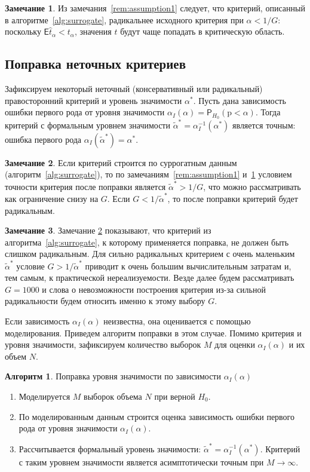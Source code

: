 \documentclass[specialist,
substylefile = spbu.rtx,
               subf,href,colorlinks=true,12pt]{disser}
\theoremstyle{definition}
\newtheorem{algorithm}{Алгоритм}
\newtheorem{remark}{Замечание}
\begin{document}
\begin{remark}\label{remark:liberal0}
	Из замечания~\ref{rem:assumption1} следует, что критерий, описанный в алгоритме~\ref{alg:surrogate}, радикальнее исходного критерия при $\alpha < 1/G$: поскольку $\mathsf E\hat t_\alpha < t_\alpha$, значения $t$ будут чаще попадать в критическую область.
\end{remark}

\subsection{Поправка неточных критериев}\label{sect:correction}
Зафиксируем некоторый неточный (консервативный или радикальный) правосторонний критерий и уровень значимости $\alpha^*$. Пусть дана зависимость ошибки первого рода от уровня значимости $\alpha_I(\alpha)=\mathsf P_{H_0}(\mathrm p < \alpha)$. Тогда критерий с формальным уровнем значимости $\widetilde\alpha^*=\alpha_I^{-1}(\alpha^*)$ является точным: ошибка первого рода $\alpha_I(\widetilde\alpha^*)=\alpha^*$.
\begin{remark}\label{remark:liberal1}
	Если критерий строится по суррогатным данным (алгоритм~\ref{alg:surrogate}), то по замечаниям~\ref{rem:assumption1} и~\ref{remark:liberal0} условием точности критерия после поправки является $\widetilde\alpha^* > 1/G$, что можно рассматривать как ограничение снизу на $G$. Если $G < 1/\widetilde\alpha^*$, то после поправки критерий будет радикальным.
\end{remark}
\begin{remark}\label{remark:liberal}
Замечание \ref{remark:liberal1} показывают, что критерий из алгоритма~\ref{alg:surrogate}, к которому применяется поправка, не должен быть слишком радикальным. Для сильно радикальных критерием с очень маленьким $\widetilde\alpha^*$ условие $G > 1/\widetilde\alpha^*$ приводит к очень большим вычислительным затратам и, тем самым, к практической нереализуемости. Везде далее будем рассматривать $G=1000$ и слова о невозможности построения критерия из-за сильной радикальности будем относить именно к этому выбору $G$.
\end{remark}

Если зависимость $\alpha_I(\alpha)$ неизвестна, она оценивается с помощью моделирования. Приведем алгоритм поправки в этом случае. Помимо критерия и уровня значимости, зафиксируем количество выборок $M$ для оценки $\alpha_I(\alpha)$ и их объем $N$.\newpage
\begin{algorithm}{Поправка уровня значимости по зависимости $\alpha_I(\alpha)$}~\cite{Larin2022}\label{alg:correction}
	\begin{enumerate}
		\item Моделируется $M$ выборок объема $N$ при верной $H_0$.
		\item По моделированным данным строится оценка зависимость ошибки первого рода от уровня значимости $\alpha_I(\alpha)$.
		\item Рассчитывается формальный уровень значимости: $\widetilde{\alpha}^*=\alpha_I^{-1}(\alpha^*)$. Критерий с таким уровнем значимости является асимптотически точным при $M\to\infty$.
	\end{enumerate}
\end{algorithm}
\end{document}
